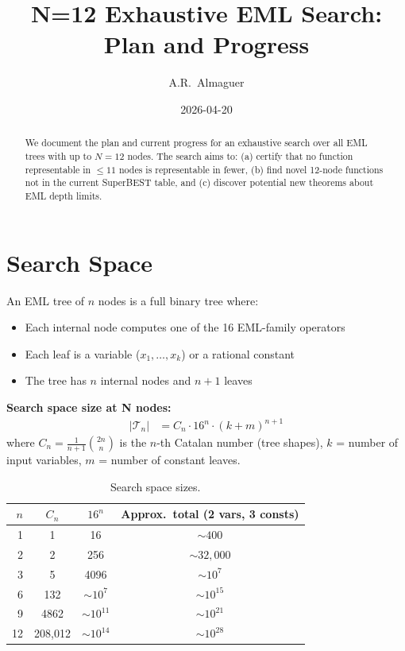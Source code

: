 \documentclass[11pt]{article}
\title{N=12 Exhaustive EML Search: Plan and Progress}
\author{A.R.\ Almaguer}
\date{2026-04-20}
\begin{document}
\maketitle

\begin{abstract}
We document the plan and current progress for an exhaustive search over all EML trees
with up to $N=12$ nodes. The search aims to: (a) certify that no function representable
in $\leq 11$ nodes is representable in fewer, (b) find novel 12-node functions not in
the current SuperBEST table, and (c) discover potential new theorems about EML depth limits.
\end{abstract}

\section{Search Space}

An EML tree of $n$ nodes is a full binary tree where:
\begin{itemize}
\item Each internal node computes one of the 16 EML-family operators
\item Each leaf is a variable ($x_1, \ldots, x_k$) or a rational constant
\item The tree has $n$ internal nodes and $n+1$ leaves
\end{itemize}

\textbf{Search space size at N nodes:}
\begin{align}
|\mathcal{T}_n| &= C_n \cdot 16^n \cdot (k+m)^{n+1}
\end{align}
where $C_n = \frac{1}{n+1}\binom{2n}{n}$ is the $n$-th Catalan number (tree shapes),
$k$ = number of input variables, $m$ = number of constant leaves.

\begin{table}[h]
\centering
\caption{Search space sizes.}
\begin{tabular}{@{}rccc@{}}
\toprule
$n$ & $C_n$ & $16^n$ & Approx.\ total (2 vars, 3 consts) \\
\midrule
1  & 1      & 16     & $\sim 400$ \\
2  & 2      & 256    & $\sim 32{,}000$ \\
3  & 5      & 4096   & $\sim 10^7$ \\
6  & 132    & $\sim 10^7$ & $\sim 10^{15}$ \\
9  & 4862   & $\sim 10^{11}$ & $\sim 10^{21}$ \\
12 & 208{,}012 & $\sim 10^{14}$ & $\sim 10^{28}$ \\
\bottomrule
\end{tabular}
\end{table}
\end{document}
